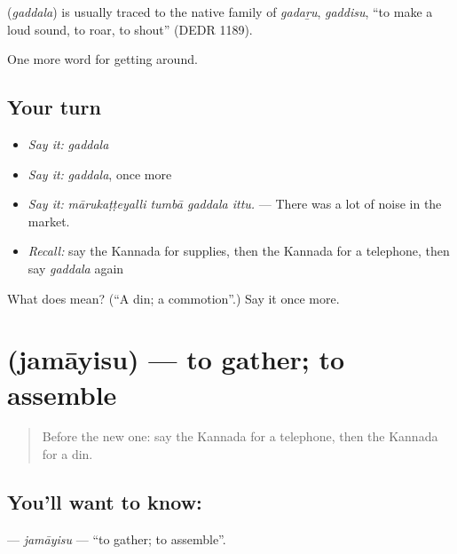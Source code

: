 \begin{cousinweb}
\textbf{} (\emph{gaddala}) is usually traced to the native family of \emph{gadaṟu}, \emph{gaddisu}, \textquotedblleft{}to make a loud sound, to roar, to shout\textquotedblright{} (DEDR 1189).
\end{cousinweb}

\begin{grammarlens}[title={What you've built}]
One more word for getting around.
\end{grammarlens}

\subsection*{Your turn}
\begin{itemize}
\raggedright
  \item \emph{Say it:} \emph{gaddala}
  \item \emph{Say it:} \emph{gaddala}, once more
  \item \emph{Say it:} \emph{mārukaṭṭeyalli tumbā gaddala ittu.} — There was a lot of noise in the market.
  \item \emph{Recall:} say the Kannada for supplies, then the Kannada for a telephone, then say \emph{gaddala} again
\end{itemize}

\begin{tcolorbox}[breakable,colback=teal!4,colframe=teal!35!black,title={Before you move on}]
What does  mean? (\textquotedblleft{}A din; a commotion\textquotedblright{}.) Say it once more.
\end{tcolorbox}
\section[\texorpdfstring{\kn{ಜಮಾಯಿಸು} (jamāyisu)}{ಜಮಾಯಿಸು (jamāyisu)}]{ (jamāyisu) — to gather; to assemble}

\label{lesson:KA-C471-jamayisu}



\begin{quote}
Before the new one: say the Kannada for a telephone, then the Kannada for a din.
\end{quote}

\subsection*{You'll want to know: }
\textbf{} — \emph{jamāyisu} — \textquotedblleft{}to gather; to assemble\textquotedblright{}.

